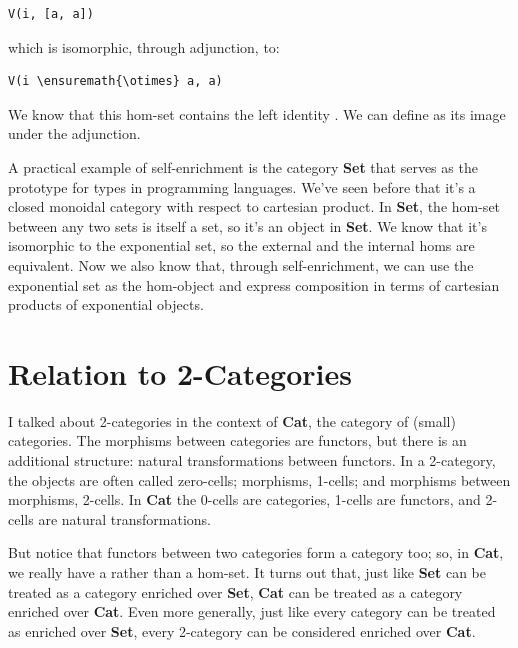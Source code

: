 \begin{Verbatim}[commandchars=\\\{\}]
V(i, [a, a])
\end{Verbatim}
which is isomorphic, through adjunction, to:

\begin{Verbatim}[commandchars=\\\{\}]
V(i \ensuremath{\otimes} a, a)
\end{Verbatim}
We know that this hom-set contains the left identity . We can
define  as its image under the adjunction.

A practical example of self-enrichment is the category \textbf{Set} that
serves as the prototype for types in programming languages. We've seen
before that it's a closed monoidal category with respect to cartesian
product. In \textbf{Set}, the hom-set between any two sets is itself a
set, so it's an object in \textbf{Set}. We know that it's isomorphic to
the exponential set, so the external and the internal homs are
equivalent. Now we also know that, through self-enrichment, we can use
the exponential set as the hom-object and express composition in terms
of cartesian products of exponential objects.

\section{Relation to 2-Categories}\label{relation-to-2-categories}

I talked about 2-categories in the context of \textbf{Cat}, the category
of (small) categories. The morphisms between categories are functors,
but there is an additional structure: natural transformations between
functors. In a 2-category, the objects are often called zero-cells;
morphisms, 1-cells; and morphisms between morphisms, 2-cells. In
\textbf{Cat} the 0-cells are categories, 1-cells are functors, and
2-cells are natural transformations.

But notice that functors between two categories form a category too; so,
in \textbf{Cat}, we really have a  rather than a
hom-set. It turns out that, just like \textbf{Set} can be treated as a
category enriched over \textbf{Set}, \textbf{Cat} can be treated as a
category enriched over \textbf{Cat}. Even more generally, just like
every category can be treated as enriched over \textbf{Set}, every
2-category can be considered enriched over \textbf{Cat}.